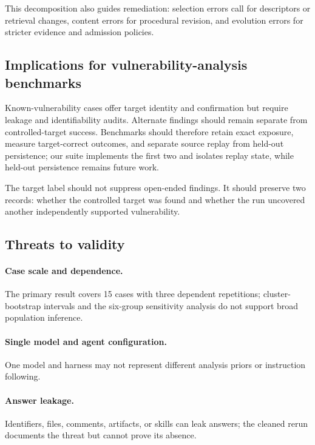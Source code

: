 \documentclass[11pt]{article}
\begin{document}
This decomposition also guides remediation: selection errors call for descriptors or
retrieval changes, content errors for procedural revision, and evolution errors for
stricter evidence and admission policies.

\subsection{Implications for vulnerability-analysis benchmarks}

Known-vulnerability cases offer target identity and confirmation but require leakage and
identifiability audits.  Alternate findings should remain separate from controlled-target
success.  Benchmarks should therefore retain exact exposure, measure target-correct
outcomes, and separate source replay from held-out persistence; our suite implements the
first two and isolates replay state, while held-out persistence remains future work.

The target label should not suppress open-ended findings.  It should preserve two records:
whether the controlled target was found and whether the run uncovered another independently
supported vulnerability.

\subsection{Threats to validity}
\label{sec:threats}

\paragraph{Case scale and dependence.}
The primary result covers 15 cases with three dependent repetitions; cluster-bootstrap
intervals and the six-group sensitivity analysis do not support broad population inference.

\paragraph{Single model and agent configuration.}
One model and harness may not represent different analysis priors or instruction following.

\paragraph{Answer leakage.}
Identifiers, files, comments, artifacts, or skills can leak answers; the cleaned rerun
documents the threat but cannot prove its absence.
\end{document}
